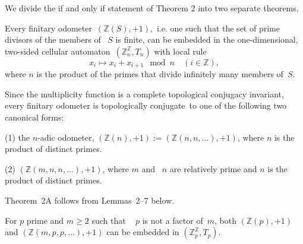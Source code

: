 \documentclass[12pt]{amsart}
\begin{document}
We divide the if and only if statement of Theorem 2 into two separate theorems.

\begin{Th2A} Every finitary {odometer}\ $({\mathbb Z}(S),+1),$ i.e. one such that the set of prime divisors of the members of ~$S$ is finite, can be embedded in the one-dimensional, two-sided {cellular automaton}\ $({\mathbb Z}_n^{\mathbb Z},T_n)$ 
 with local rule
$$x_i \mapsto  x_i + x_{i+1} \mod n \quad (i \in {\mathbb Z}),$$
where $n$ is the product of the primes that divide infinitely many members of~$S$.
\end{Th2A}

Since the multiplicity function is a  complete topological conjugacy invariant,  every finitary odometer  
is {topologically conjugate}\ to one of the following two canonical forms:

\noindent (1) the $n$-adic odometer, 
$({\mathbb Z}(n),+1) := ({\mathbb Z}(n,n,\dots),+1)$,  where $n$ is the product of distinct primes.

\noindent (2) $({\mathbb Z}(m,n,n,\dots),+1)$, where $m$ and ~$n$ are relatively prime and $n$ is the product of distinct primes.

Theorem~2A follows from  Lemmas~2--7 below.

 

\begin{lemma}
For $p$ prime and $m\ge2$ such that ~ $p$ is not a factor of~$m$, both 
$({\mathbb Z}(p),+1)$ and
$({\mathbb Z}(m,p,p,\dots),+1)$
 can be embedded in
$({\mathbb Z}_p^{\mathbb Z},T_p).$ 
\end{lemma}
\end{document}
